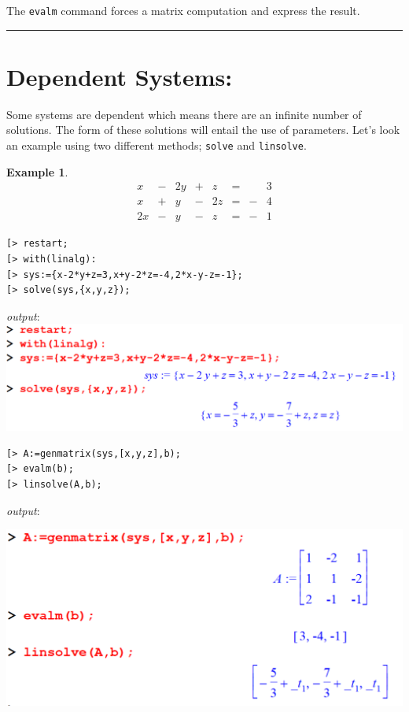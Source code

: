 \documentclass[
]{book}
\theoremstyle{definition}
\theoremstyle{definition}
\newtheorem{example}{Example}[chapter]
\theoremstyle{definition}
\theoremstyle{definition}
\theoremstyle{remark}
\begin{document}
The \texttt{evalm} command forces a matrix computation and express the result.

\begin{center}\rule{0.5\linewidth}{0.5pt}\end{center}

\section{Dependent Systems:}\label{dependent-systems}

Some systems are dependent which means there are an infinite number of solutions. The form of these solutions will entail the use of parameters.
Let's look an example using two different methods; \texttt{solve} and \texttt{linsolve}.

\begin{example}
\protect\hypertarget{exm:unnamed-chunk-6}{}\label{exm:unnamed-chunk-6}\[
\begin{array}{ccccccccc}
x &-& 2y&+& z &=& &3\\
x &+& y &-& 2z&=&-&4\\
2x&-& y &-& z &=&-&1  
\end{array}
\]
\end{example}

\begin{verbatim}
[> restart;
[> with(linalg):
[> sys:={x-2*y+z=3,x+y-2*z=-4,2*x-y-z=-1};
[> solve(sys,{x,y,z});
\end{verbatim}

\emph{output}:
\includegraphics{figures/Lesson 5/fig9.png}

\begin{verbatim}
[> A:=genmatrix(sys,[x,y,z],b);
[> evalm(b);
[> linsolve(A,b);
\end{verbatim}

\emph{output}:

\includegraphics{figures/Lesson 5/fig10.png}
\end{document}
